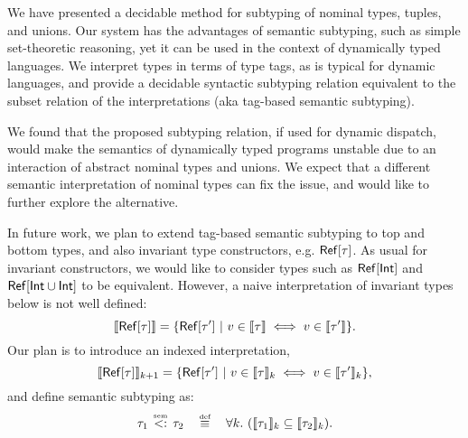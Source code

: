 We have presented a decidable method for subtyping 
of nominal types, tuples, and unions.
Our system has the advantages of semantic subtyping, 
such as simple set-theoretic reasoning, 
yet it can be used in the context of dynamically typed languages.
We interpret types in terms of type tags, 
as is typical for dynamic languages,
and provide a decidable syntactic subtyping relation %
equivalent to the subset relation of the interpretations
(aka tag-based semantic subtyping).

We found that the proposed subtyping relation, 
if used for dynamic dispatch, 
would make the semantics of dynamically typed programs unstable
due to an interaction of abstract nominal types and unions.
We expect that a different semantic interpretation of nominal types 
can fix the issue, and would like to further explore the alternative.

In future work, we plan to extend tag-based semantic subtyping 
to top and bottom types, 
and also invariant type constructors, e.g. $\mathsf{Ref}[\tau]$. %
As usual for invariant constructors, 
we would like to consider types such as $\mathsf{Ref}[\mathsf{Int}]$
and $\mathsf{Ref}[\mathsf{Int} \cup \mathsf{Int}]$ to be equivalent.
However, a naive interpretation of invariant types below
is not well defined:
\[
\llbracket \mathsf{Ref}[\tau] \rrbracket = 
\{ \mathsf{Ref}[\tau'] ~\vert~ v \in \llbracket \tau \rrbracket \iff v \in \llbracket \tau' \rrbracket \}.
\]
Our plan is to introduce an indexed interpretation,
\[
\llbracket \mathsf{Ref}[\tau] \rrbracket_{k+1} = \{ \mathsf{Ref}[\tau'] 
    ~\vert~ v \in \llbracket \tau \rrbracket_k \iff v \in \llbracket \tau' \rrbracket_k \},
\]
and define semantic subtyping as:
\[
\bjtruesemsub{\ty_1}{\ty_2} \quad \defsign \quad
\forall k.\ (\interpty{\ty_1}_k \subseteq \interpty{\ty_2}_k).
\]


